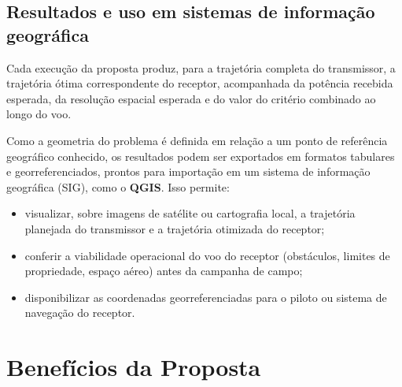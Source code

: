 \documentclass[11pt,a4paper]{article}
\begin{document}
\subsection{Resultados e uso em sistemas de informação geográfica}

Cada execução da proposta produz, para a trajetória completa do transmissor, a trajetória ótima
correspondente do receptor, acompanhada da potência recebida esperada, da resolução espacial
esperada e do valor do critério combinado ao longo do voo.

Como a geometria do problema é definida em relação a um ponto de referência geográfico conhecido,
os resultados podem ser exportados em formatos tabulares e georreferenciados, prontos para
importação em um sistema de informação geográfica (SIG), como o \textbf{QGIS}. Isso permite:
\begin{itemize}[nosep]
  \item visualizar, sobre imagens de satélite ou cartografia local, a trajetória planejada do
  transmissor e a trajetória otimizada do receptor;
  \item conferir a viabilidade operacional do voo do receptor (obstáculos, limites de propriedade,
  espaço aéreo) antes da campanha de campo;
  \item disponibilizar as coordenadas georreferenciadas para o piloto ou sistema de navegação do
  receptor.
\end{itemize}

\section{Benefícios da Proposta}
\end{document}
